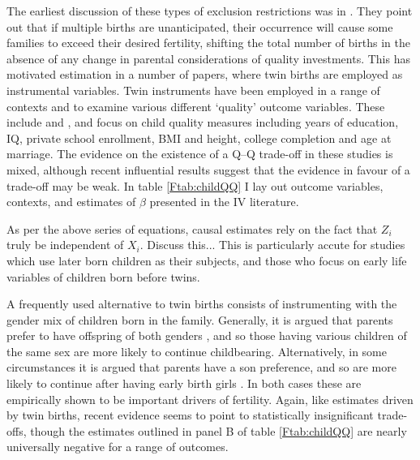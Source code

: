 The earliest discussion of these types of exclusion restrictions was in 
\citet{RosenzweigWolpin1980}. They point out that if multiple births are 
unanticipated, their occurrence will cause some families to exceed their desired
fertility, shifting the total number of births in the absence of any change in 
parental considerations of quality investments.  This has motivated estimation 
in a number of papers, where twin births are employed as instrumental 
variables.  Twin instruments have been employed in a range of contexts and
to examine various different `quality' outcome variables.  These include
\citet{Blacketal2005,Caceres2006,Lietal2008,Dayiogluetal2009,Sanhueza2009,
Blacketal2010,Angristetal2010,FitzsimonsMalde2010} and 
\citet{SouzaPonczek2012}, and focus on child quality measures including years of 
education, IQ, private school enrollment, BMI and height, college completion and 
age at marriage.  The evidence on the existence of a Q--Q trade-off in these 
studies is mixed, although recent influential results suggest that the evidence 
in favour of a trade-off may be weak.  In table \ref{Ftab:childQQ} I lay out 
outcome variables, contexts, and estimates of $\beta$ presented in the IV 
literature.

As per the above series of equations, causal estimates rely on the fact that
$Z_i$ truly be independent of $X_i$.  Discuss this...
This is particularly accute for studies which use later born \citet{Glicketal2007}
children as their subjects, and those who focus on early life variables of 
children born before twins.

A frequently used alternative to twin births consists of instrumenting with the 
gender mix of children born in the family. Generally, it is argued that parents
prefer to have offspring of both genders \citet{ConleyGlauber2006,Angristetal2010,
Beckeretal2010,MillimetWang2011,FitzsimonsMalde2014}, and so those having various 
children of the same sex are more likely to continue childbearing. Alternatively, 
in some circumstances it is argued that parents have a son preference, and so are 
more likely to continue after having early birth girls \citet{Lee2008,
KumarKugler2011}. In both cases these are empirically shown to be important 
drivers of fertility.  Again, like estimates driven by twin births, recent 
evidence seems to point to statistically insignificant trade-offs, though the 
estimates outlined in panel B of table \ref{Ftab:childQQ} are nearly universally 
negative for a range of outcomes.

